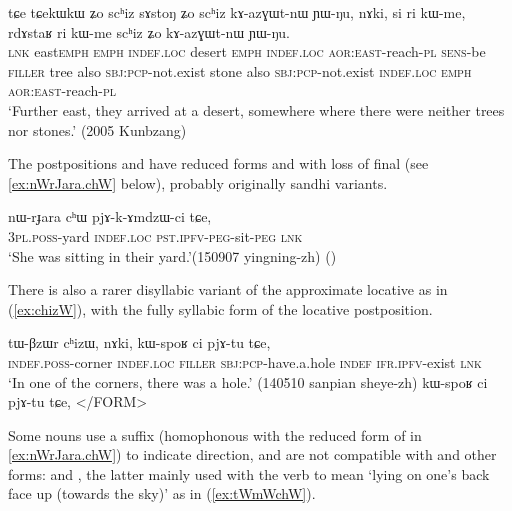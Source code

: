 \begin{exe}
\ex \label{ex:schiz.kazGWtnW}
 \gll  tɕe tɕekɯ\redp{}kɯ ʑo scʰiz sɤstoŋ ʑo scʰiz kɤ-azɣɯt-nɯ ɲɯ-ŋu, nɤki, si ri kɯ-me, rdɤstaʁ ri kɯ-me scʰiz ʑo kɤ-azɣɯt-nɯ ɲɯ-ŋu. \\
 \textsc{lnk} east\redp{}\textsc{emph} \textsc{emph} \textsc{indef}.\textsc{loc} desert \textsc{emph} \textsc{indef}.\textsc{loc} \textsc{aor}:\textsc{east}-reach-\textsc{pl} \textsc{sens}-be \textsc{filler} tree also \textsc{sbj}:\textsc{pcp}-not.exist stone also \textsc{sbj}:\textsc{pcp}-not.exist \textsc{indef}.\textsc{loc}  \textsc{emph}  \textsc{aor}:\textsc{east}-reach-\textsc{pl} \\
 \glt `Further east, they arrived at  a desert, somewhere where there were neither trees nor stones.' (2005 Kunbzang)
\end{exe}

The postpositions  and  have reduced forms  and  with loss of final  (see \ref{ex:nWrJara.chW} below), probably originally sandhi variants.

\begin{exe}
\ex \label{ex:nWrJara.chW}
\gll nɯ-rɟara cʰɯ pjɤ-k-ɤmdzɯ-ci tɕe, \\
\textsc{3pl}.\textsc{poss}-yard \textsc{indef}.\textsc{loc} \textsc{pst}.\textsc{ipfv}-\textsc{peg}-sit-\textsc{peg} \textsc{lnk} \\
\glt `She was sitting in their yard.'(150907 yingning-zh) ()
\end{exe}

There is also a rarer disyllabic variant of the approximate locative  as in (\ref{ex:chizW}), with the fully syllabic form  of the locative postposition.

\begin{exe}
\ex \label{ex:chizW}
\gll tɯ-βzɯr cʰizɯ, nɤki, kɯ-spoʁ ci pjɤ-tu tɕe,  \\
\textsc{indef}.\textsc{poss}-corner \textsc{indef}.\textsc{loc} \textsc{filler} \textsc{sbj}:\textsc{pcp}-have.a.hole \textsc{indef} \textsc{ifr}.\textsc{ipfv}-exist \textsc{lnk} \\
\glt `In one of the corners, there was a hole.' (140510 sanpian sheye-zh) kɯ-spoʁ ci pjɤ-tu tɕe, </FORM>
\end{exe}

Some nouns use a suffix  (homophonous with the reduced form of  in \ref{ex:nWrJara.chW}) to indicate direction, and are not compatible with  and other forms:  and , the latter mainly used with the verb  to mean `lying on one's back face up (towards the sky)' as in (\ref{ex:tWmWchW}).

